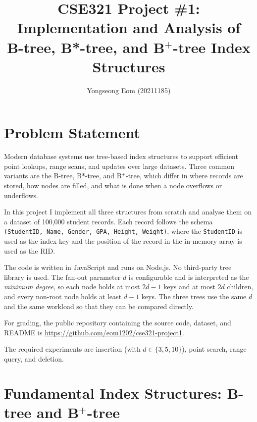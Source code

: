 \documentclass[sigconf]{acmart}
\begin{document}
\title{CSE321 Project \#1: Implementation and Analysis of\\
B-tree, B*-tree, and B$^+$-tree Index Structures}

\author{Yongseong Eom (20211185)}

\renewcommand{\shortauthors}{Eom}

\maketitle

\section{Problem Statement}

Modern database systems use tree-based index structures to support
efficient point lookups, range scans, and updates over large datasets.
Three common variants are the B-tree, B*-tree, and B$^+$-tree, which
differ in where records are stored, how nodes are filled, and what
is done when a node overflows or underflows.

In this project I implement all three structures from scratch and
analyse them on a dataset of 100{,}000 student records. Each record
follows the schema
\texttt{(StudentID, Name, Gender, GPA, Height, Weight)}, where the
\texttt{StudentID} is used as the index key and the position of the
record in the in-memory array is used as the RID.

The code is written in JavaScript and runs on Node.js. No
third-party tree library is used. The fan-out parameter $d$ is
configurable and is interpreted as the \emph{minimum degree}, so
each node holds at most $2d-1$ keys and at most $2d$ children, and
every non-root node holds at least $d-1$ keys. The three trees use
the same $d$ and the same workload so that they can be compared
directly.

For grading, the public repository containing the source code,
dataset, and README is
\url{https://github.com/eom1202/cse321-project1}.

The required experiments are insertion (with $d \in \{3,5,10\}$),
point search, range query, and deletion.

\section{Fundamental Index Structures: B-tree and B$^+$-tree}
\end{document}
